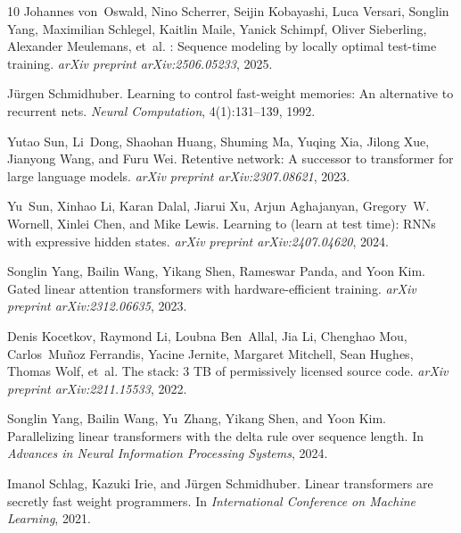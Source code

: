 \documentclass{article}
\begin{document}
\begin{thebibliography}{10}
Johannes von~Oswald, Nino Scherrer, Seijin Kobayashi, Luca Versari, Songlin Yang,
  Maximilian Schlegel, Kaitlin Maile, Yanick Schimpf, Oliver Sieberling,
  Alexander Meulemans, et~al.
: Sequence modeling by locally optimal test-time training.
\newblock \emph{arXiv preprint arXiv:2506.05233}, 2025.

J{\"u}rgen Schmidhuber.
\newblock Learning to control fast-weight memories: An alternative to recurrent
  nets.
\newblock \emph{Neural Computation}, 4(1):131--139, 1992.

Yutao Sun, Li~Dong, Shaohan Huang, Shuming Ma, Yuqing Xia, Jilong Xue,
  Jianyong Wang, and Furu Wei.
\newblock Retentive network: A successor to transformer for large language
  models.
\newblock \emph{arXiv preprint arXiv:2307.08621}, 2023.

Yu~Sun, Xinhao Li, Karan Dalal, Jiarui Xu, Arjun Aghajanyan, Gregory~W.
  Wornell, Xinlei Chen, and Mike Lewis.
\newblock Learning to (learn at test time): {RNN}s with expressive hidden
  states.
\newblock \emph{arXiv preprint arXiv:2407.04620}, 2024.

Songlin Yang, Bailin Wang, Yikang Shen, Rameswar Panda, and Yoon Kim.
\newblock Gated linear attention transformers with hardware-efficient training.
\newblock \emph{arXiv preprint arXiv:2312.06635}, 2023.

Denis Kocetkov, Raymond Li, Loubna Ben~Allal, Jia Li, Chenghao Mou,
  Carlos~Mu{\~n}oz Ferrandis, Yacine Jernite, Margaret Mitchell, Sean Hughes,
  Thomas Wolf, et~al.
\newblock The stack: 3 {TB} of permissively licensed source code.
\newblock \emph{arXiv preprint arXiv:2211.15533}, 2022.

Songlin Yang, Bailin Wang, Yu~Zhang, Yikang Shen, and Yoon Kim.
\newblock Parallelizing linear transformers with the delta rule over sequence length.
\newblock In \emph{Advances in Neural Information Processing Systems}, 2024.

Imanol Schlag, Kazuki Irie, and J{\"u}rgen Schmidhuber.
\newblock Linear transformers are secretly fast weight programmers.
\newblock In \emph{International Conference on Machine Learning}, 2021.

\end{thebibliography}
\end{document}
